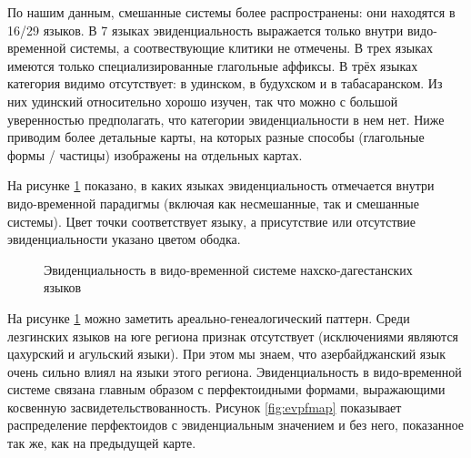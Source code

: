 По нашим данным, смешанные системы более распространены: они находятся в 16/29 языков. В 7 языках эвиденциальность выражается только внутри видо-временной системы, а соотвествующие клитики не отмечены. В трех языках имеются только специализированные глагольные аффиксы. В трёх языках категория видимо отсутствует: в удинском, в будухском и в табасаранском. Из них удинский относительно хорошо изучен, так что можно с большой уверенностью предполагать, что категории эвиденциальности в нем нет. Ниже приводим более детальные карты, на которых разные способы (глагольные формы / частицы) изображены на отдельных картах.

На рисунке \ref{fig:evtensemap} показано, в каких языках эвиденциальность отмечается внутри видо-временной парадигмы (включая как несмешанные, так и смешанные системы). Цвет точки соответствует языку, а присутствие или отсутствие эвиденциальности указано цветом ободка.

\begin{figure}[H]
\centering
\caption{Эвиденциальность в видо-временной системе нахско-дагестанских языков}
\label{fig:evtensemap}
\vspace{0.5cm}
\end{figure}

На рисунке \ref{fig:evtensemap} можно заметить ареально-генеалогический паттерн. Среди лезгинских языков на юге региона признак отсутствует (исключениями являются цахурский и агульский языки). При этом мы знаем, что азербайджанский язык очень сильно влиял на языки этого региона. Эвиденциальность в видо-временной системе связана главным образом с перфектоидными формами, выражающими косвенную засвидетельствованность. Рисунок \ref{fig:evpfmap} показывает распределение перфектоидов с эвиденциальным значением и без него, показанное так же, как на предыдущей карте.

